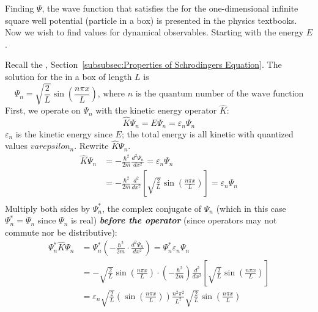 Finding $\Psi$, the wave function that satisfies the  for the one-dimensional infinite square well potential (particle in a box) is presented in the physics textbooks.
Now we wish to find values for dynamical observables.
Starting with the energy $E$.

Recall the , Section~\ref{subsubsec:Properties of Schrodingers Equation}.
The solution for the  in a box of length $L$ is
\begin{equation*}
	\Psi_{n} = \sqrt{\frac{2}{L}} \sin \left( \frac{n \pi x}{L} \right) \text{, where $n$ is the quantum number of the wave function}
\end{equation*}
First, we operate on $\Psi_{n}$ with the kinetic energy operator $\widehat{K}$:
\begin{equation*}
	\widehat{K} \Psi_{n} = E \Psi_{n} = \varepsilon_{n} \Psi_{n}
\end{equation*}
$\varepsilon_{n}$ is the kinetic energy since $E$; the total energy is all kinetic with quantized values $varepsilon_{n}$. \newline
Rewrite $\widehat{K} \Psi_{n}$.
\begin{align*}
	\widehat{K} \Psi_{n} &= -\frac{\hbar^{2}}{2m} \frac{d^{2} \Psi_{n}}{dx^{2}} = \varepsilon_{n} \Psi_{n} \\
	&= -\frac{\hbar^{2}}{2m} \frac{d^{2}}{dx^{2}} \left[ \sqrt{\frac{2}{L}} \sin \left( \frac{n \pi x}{L} \right) \right] = \varepsilon_{n} \Psi_{n} \\
\end{align*}
Multiply both sides by $\Psi_{n}^{*}$, the complex conjugate of $\Psi_{n}$ (which in this case $\Psi_{n}^{*} = \Psi_{n}$ since $\Psi_{n}$ is real) \emph{\textbf{before the operator}} (since operators may not commute nor be distributive):
\begin{align*}
	\Psi_{n}^{*} \widehat{K} \Psi_{n} &= \Psi_{n}^{*} \left( -\frac{\hbar^{2}}{2m} \cdot \frac{d^{2} \Psi_{n}}{dx^{2}} \right) = \Psi_{n}^{*} \varepsilon_{n} \Psi_{n} \\
	&= -\sqrt{\frac{2}{L}} \sin \left( \frac{n \pi x}{L} \right) \cdot \left( -\frac{\hbar^{2}}{2m} \right) \frac{d^2}{dx^{2}} \left[ \sqrt{\frac{2}{L}} \sin \left( \frac{n \pi x}{L} \right) \right] \\
	&= \varepsilon_{n} \sqrt{\frac{2}{L}} \left( \sin \left( \frac{n \pi x}{L} \right) \right) \frac{n^{2} \pi^{2}}{L^{2}} \sqrt{\frac{2}{L}} \sin \left( \frac{n \pi x}{L} \right) \\
\end{align*}
